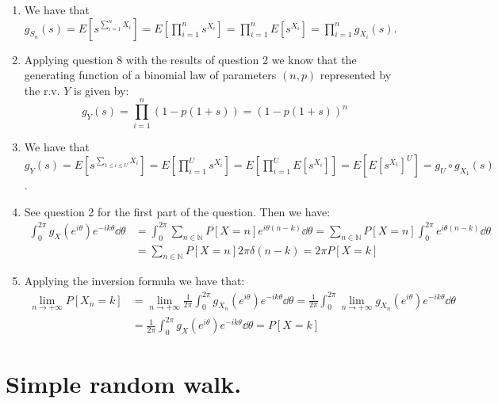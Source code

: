 \documentclass[10pt,a4paper]{article}
\begin{document}
\begin{enumerate}
\item We have that $g_{S_n}(s) = E[s^{\sum_{i = 1}^n X_i}] = E[\prod_{i = 1}^n s^{X_i}] = \prod_{i = 1}^n E[s^{X_i}] = \prod_{i = 1}^n g_{X_i}(s)$.

\item Applying question 8 with the results of question 2 we know that the generating function of a binomial law of parameters $(n, p)$ represented by the r.v. $Y$ is given by:
\[
g_Y(s) = \prod_{i = 1}^n (1 - p(1 + s)) = (1 - p(1 + s))^n
\]

\item We have that $g_Y(s) = E[s^{\sum_{1 \leq i \leq U} X_i}] = E[\prod_{i = 1}^U s^{X_i}] = E[\prod_{i = 1}^U E[s^{X_i}]] = E[E[s^{X_1}]^U] = g_U \circ g_{X_1} (s)$.

\item See question 2 for the first part of the question. Then we have:
\begin{align*}
\int_0^{2\pi} g_X(e^{i \theta}) e^{- i k \theta} \dd \theta &= \int_{0}^{2 \pi} \sum_{n \in \mathbb{N}} P[X = n] e^{i \theta(n - k)} \dd \theta = \sum_{n \in \mathbb{N}} P[X = n] \int_0^{2 \pi} e^{i \theta ( n -k )} \dd \theta \\
&= \sum_{n \in \mathbb{N}} P[X = n] 2 \pi \delta(n - k) = 2 \pi P[X = k]  
\end{align*}  

\item Applying the inversion formula we have that:
\begin{align*}
\lim_{n \to +\infty} P[X_n = k] &= \lim_{n \to +\infty} \frac{1}{2\pi} \int_0^{2\pi} g_{X_n}(e^{i\theta})e^{-ik\theta} \dd \theta = \frac{1}{2\pi} \int_0^{2\pi} \lim_{n \to +\infty} g_{X_n}(e^{i\theta})e^{- i k \theta} \dd \theta \\
&= \frac{1}{2\pi}\int_0^{2\pi} g_{X}(e^{i\theta})e^{-ik\theta} \dd \theta = P[X = k]
\end{align*}
\end{enumerate}

\section{Simple random walk.}
\end{document}
